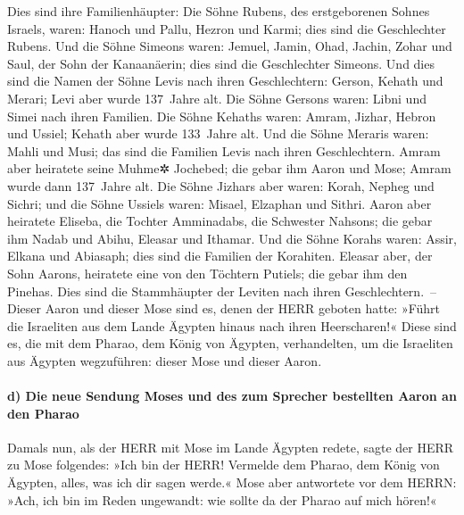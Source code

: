  Dies sind ihre Familienhäupter: Die Söhne Rubens, des
erstgeborenen Sohnes Israels, waren: Hanoch und Pallu, Hezron und Karmi;
dies sind die Geschlechter Rubens.  Und die Söhne Simeons
waren: Jemuel, Jamin, Ohad, Jachin, Zohar und Saul, der Sohn der
Kanaanäerin; dies sind die Geschlechter Simeons.  Und
dies sind die Namen der Söhne Levis nach ihren Geschlechtern: Gerson,
Kehath und Merari; Levi aber wurde 137~Jahre alt.  Die
Söhne Gersons waren: Libni und Simei nach ihren Familien.
 Die Söhne Kehaths waren: Amram, Jizhar, Hebron und
Ussiel; Kehath aber wurde 133~Jahre alt.  Und die Söhne
Meraris waren: Mahli und Musi; das sind die Familien Levis nach ihren
Geschlechtern.  Amram aber heiratete seine Muhme✲
Jochebed; die gebar ihm Aaron und Mose; Amram wurde dann 137~Jahre alt.
 Die Söhne Jizhars aber waren: Korah, Nepheg und Sichri;
 und die Söhne Ussiels waren: Misael, Elzaphan und
Sithri.  Aaron aber heiratete Eliseba, die Tochter
Amminadabs, die Schwester Nahsons; die gebar ihm Nadab und Abihu,
Eleasar und Ithamar.  Und die Söhne Korahs waren: Assir,
Elkana und Abiasaph; dies sind die Familien der Korahiten.
 Eleasar aber, der Sohn Aarons, heiratete eine von den
Töchtern Putiels; die gebar ihm den Pinehas. Dies sind die Stammhäupter
der Leviten nach ihren Geschlechtern.~--  Dieser Aaron
und dieser Mose sind es, denen der HERR geboten hatte: »Führt die
Israeliten aus dem Lande Ägypten hinaus nach ihren Heerscharen!«
 Diese sind es, die mit dem Pharao, dem König von
Ägypten, verhandelten, um die Israeliten aus Ägypten wegzuführen: dieser
Mose und dieser Aaron.

\hypertarget{d-die-neue-sendung-moses-und-des-zum-sprecher-bestellten-aaron-an-den-pharao}{%
\paragraph{d) Die neue Sendung Moses und des zum Sprecher bestellten
Aaron an den
Pharao}\label{d-die-neue-sendung-moses-und-des-zum-sprecher-bestellten-aaron-an-den-pharao}}

 Damals nun, als der HERR mit Mose im Lande Ägypten
redete,  sagte der HERR zu Mose folgendes: »Ich bin der
HERR! Vermelde dem Pharao, dem König von Ägypten, alles, was ich dir
sagen werde.«  Mose aber antwortete vor dem HERRN: »Ach,
ich bin im Reden ungewandt: wie sollte da der Pharao auf mich hören!«

